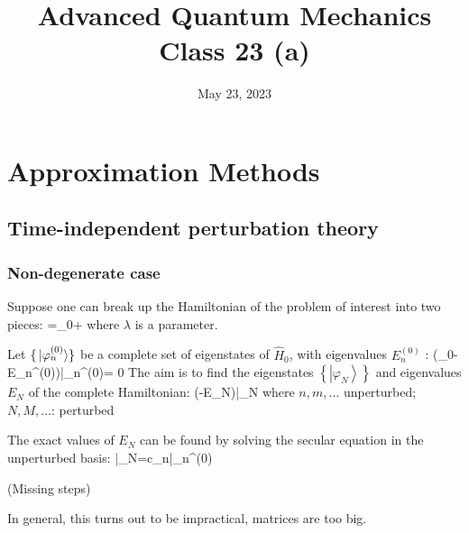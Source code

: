 \documentclass[12pt]{article}
\title{Advanced Quantum Mechanics\\Class 23 (a)}
\date{May 23, 2023}                                           %
\begin{document}
\maketitle

\section{Approximation Methods}

\subsection{Time-independent perturbation theory}

\subsubsection{Non-degenerate case}

Suppose one can break up the Hamiltonian of the
problem of interest into two pieces:
\be
{}=_{0}+\lambda {}
\ee
where $\lambda$ is a parameter.


Let $\{\ket*{\varphi_{n}^{(0)}}\}$ be a complete set of eigenstates of $\hat{H}_{0}$,
with eigenvalues $E_{n}^{(0)}$ :
\be
\left(_{0}-E_{n}^{(0)}\right)\left|\varphi_{n}^{(0)}\right\rangle= 0
\ee
The aim is to find the eigenstates $\left\{\left|\varphi_{N}\right\rangle\right\}$ and eigenvalues
$E_{N}$ of the complete Hamiltonian:
\be
\left(-E_{N}\right)\left|\varphi_{N}\right{}
\label{eq:g3}
\ee
where $n,m,\ldots$ unperturbed; $N,M,\ldots$: perturbed

The exact values of $E_{N}$ can be found by solving
the secular equation in the unperturbed basis:
\be
\left|\varphi_{N}\right\rangle=\sum c_{n}\left|\varphi_{n}^{(0)}\right\rangle
\ee

(Missing steps)
\setcounter{equation}{6}

\be
{}
\ee
In general, this turns out to be impractical, matrices are too big.

\end{document}
